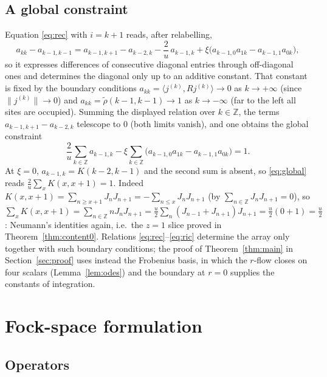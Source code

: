 \documentclass[11pt]{article}
\theoremstyle{definition}
\theoremstyle{remark}
\newcommand{\Z}{\mathbb{Z}}
\begin{document}
\subsection{A global constraint}

Equation \eqref{eq:rec} with $i=k+1$ reads, after relabelling,
\[
a_{kk}-a_{k-1,k-1}=a_{k-1,k+1}-a_{k-2,k}-\frac2u\,a_{k-1,k}+\xi\bigl(a_{k-1,0}a_{1k}-a_{k-1,1}a_{0k}\bigr),
\]
so it expresses differences of consecutive diagonal entries through off-diagonal ones and determines the diagonal only up to an additive constant. That constant is fixed by the boundary conditions $a_{kk}=\langle j^{(k)},Rj^{(k)}\rangle\to0$ as $k\to+\infty$ (since $\|j^{(k)}\|\to0$) and $a_{kk}=\tilde\rho(k-1,k-1)\to1$ as $k\to-\infty$ (far to the left all sites are occupied). Summing the displayed relation over $k\in\Z$, the terms $a_{k-1,k+1}-a_{k-2,k}$ telescope to $0$ (both limits vanish), and one obtains the global constraint
\begin{equation}\label{eq:global}
\frac2u\sum_{k\in\Z}a_{k-1,k}-\xi\sum_{k\in\Z}\bigl(a_{k-1,0}a_{1k}-a_{k-1,1}a_{0k}\bigr)=1 .
\end{equation}
At $\xi=0$, $a_{k-1,k}=K(k-2,k-1)$ and the second sum is absent, so \eqref{eq:global} reads $\frac2u\sum_xK(x,x+1)=1$. Indeed $K(x,x+1)=\sum_{n\ge x+1}J_nJ_{n+1}=-\sum_{n\le x}J_nJ_{n+1}$ (by $\sum_{n\in\Z}J_nJ_{n+1}=0$), so $\sum_xK(x,x+1)=\sum_{n\in\Z}nJ_nJ_{n+1}=\frac u2\sum_n(J_{n-1}+J_{n+1})J_{n+1}=\frac u2(0+1)=\frac u2$: Neumann's identities again, i.e.\ the $z=1$ slice proved in Theorem~\ref{thm:content0}. Relations \eqref{eq:rec}--\eqref{eq:ric} determine the array only together with such boundary conditions; the proof of Theorem~\ref{thm:main} in Section~\ref{sec:proof} uses instead the Frobenius basis, in which the $r$-flow closes on four scalars (Lemma~\ref{lem:odes}) and the boundary at $r=0$ supplies the constants of integration.

\section{Fock-space formulation}\label{sec:fock}

\subsection{Operators}
\end{document}
